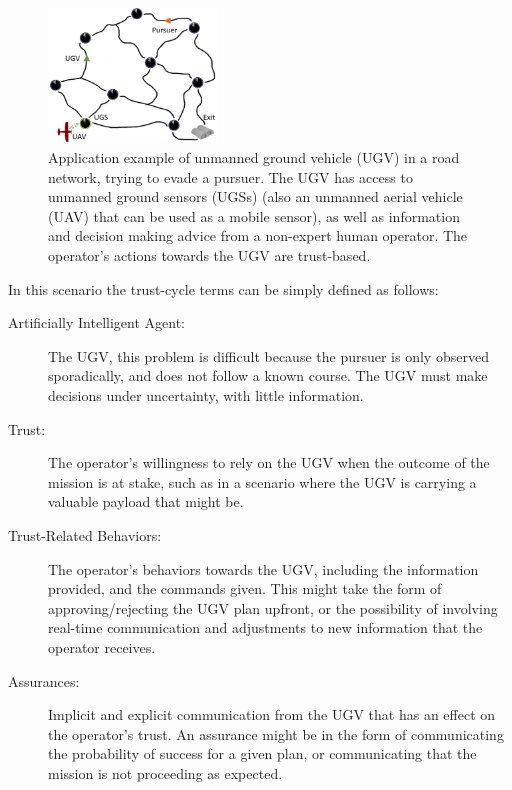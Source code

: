 	\begin{figure}[htbp]
    	\centering
     	\includegraphics[width=0.4\textwidth]{Figures/RoadNet}
    	\caption{Application example of unmanned ground vehicle (UGV) in a road network, trying to evade a pursuer. The UGV has access to unmanned ground sensors (UGSs) (also an unmanned aerial vehicle (UAV) that can be used as a mobile sensor), as well as information and decision making advice from a non-expert human operator. The operator's actions towards the UGV are trust-based.}
        \label{fig:RoadNet}
    \end{figure}

    In this scenario the trust-cycle terms can be simply defined as follows:

    \begin{description}
        \item [Artificially Intelligent Agent:] The UGV, this problem is difficult because the pursuer is only observed sporadically, and does not follow a known course. The UGV must make decisions under uncertainty, with little information. 
        \item [Trust:] The operator's willingness to rely on the UGV when the outcome of the mission is at stake, such as in a scenario where the UGV is carrying a valuable payload that might be.
        \item [Trust-Related Behaviors:] The operator's behaviors towards the UGV, including the information provided, and the commands given. This might take the form of approving/rejecting the UGV plan upfront, or the possibility of involving real-time communication and adjustments to new information that the operator receives.
        \item [Assurances:] Implicit and explicit communication from the UGV that has an effect on the operator's trust. An assurance might be in the form of communicating the probability of success for a given plan, or communicating that the mission is not proceeding as expected.
    \end{description}

